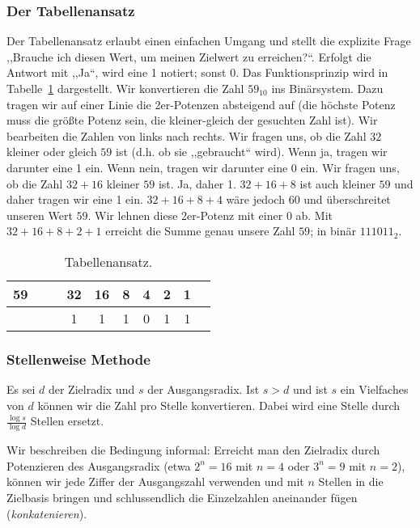 \subsubsection{Der Tabellenansatz}
%
Der Tabellenansatz erlaubt einen einfachen Umgang und stellt die explizite
Frage ,,Brauche ich diesen Wert, um meinen Zielwert zu erreichen?{}``. Erfolgt
die Antwort mit ,,Ja``, wird eine 1 notiert; sonst 0. Das Funktionsprinzip
wird in Tabelle~\ref{tab:table_approach} dargestellt. Wir konvertieren die
Zahl $59_{10}$ ins Binärsystem. Dazu tragen wir auf einer Linie die
2er-Potenzen absteigend auf (die höchste Potenz muss die größte Potenz sein,
die kleiner-gleich der gesuchten Zahl ist). Wir bearbeiten die Zahlen
von links nach rechts. Wir fragen uns, ob die Zahl $32$ kleiner oder gleich
$59$ ist (d.h. ob sie ,,gebraucht`` wird). Wenn ja, tragen wir darunter
eine 1 ein. Wenn nein, tragen wir darunter eine 0 ein.
Wir fragen uns, ob die Zahl $32+16$ kleiner $59$ ist. Ja, daher 1.
$32+16+8$ ist auch kleiner $59$ und daher tragen wir eine 1 ein.
$32+16+8+4$ wäre jedoch $60$ und überschreitet unseren Wert $59$.
Wir lehnen diese 2er-Potenz mit einer $0$ ab. Mit $32+16+8+2+1$ erreicht
die Summe genau unsere Zahl $59$; in binär $111011_2$.
%
\begin{table}[ht]
  \begin{center}
    \begin{tabular}{lccccccccc}
     \hline
      59 & & & 32 & 16 & 8 & 4 & 2 & 1 \\
     \hline \hline
         & & &  1 &  1 & 1 & 0 & 1 & 1
    \end{tabular}
    \caption{Tabellenansatz.}
    \label{tab:table_approach}
  \end{center}
\end{table}

\subsubsection{Stellenweise Methode}
%
Es sei $d$ der Zielradix und $s$ der Ausgangsradix. Ist $s > d$ und
ist $s$ ein Vielfaches von $d$ können wir die Zahl pro Stelle konvertieren.
Dabei wird eine Stelle durch $\frac{\log{s}}{\log{d}}$ Stellen ersetzt.

Wir beschreiben die Bedingung informal: Erreicht man den Zielradix durch
Potenzieren des Ausgangsradix
(etwa $2^n = 16$ mit $n=4$ oder $3^n = 9$ mit $n=2$), können wir jede
Ziffer der Ausgangszahl verwenden und mit $n$ Stellen in die Zielbasis
bringen und schlussendlich die Einzelzahlen aneinander fügen
(\emph{konkatenieren}).


